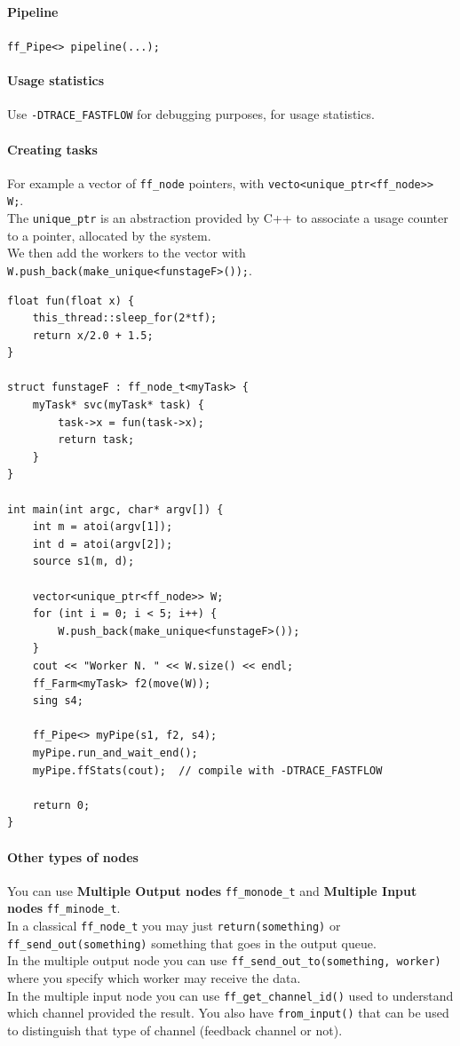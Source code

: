 \documentclass[10pt]{report}
\begin{document}
\paragraph{Pipeline} \texttt{ff\_Pipe<> pipeline(...);}
\paragraph{Usage statistics} Use \texttt{-DTRACE\_FASTFLOW} for debugging purposes, for usage statistics.
\paragraph{Creating tasks} For example a vector of \texttt{ff\_node} pointers, with \texttt{vecto<unique\_ptr<ff\_node>> W;}.\\
The \texttt{unique\_ptr} is an abstraction provided by C++ to associate a usage counter to a pointer, allocated by the system.\\
We then add the workers to the vector with \texttt{W.push\_back(make\_unique<funstageF>());}.
\pagebreak
\begin{lstlisting}[style=myC]
float fun(float x) {
	this_thread::sleep_for(2*tf);
	return x/2.0 + 1.5;
}

struct funstageF : ff_node_t<myTask> {
	myTask* svc(myTask* task) {
		task->x = fun(task->x);
		return task;
	}
}

int main(int argc, char* argv[]) {
	int m = atoi(argv[1]);
	int d = atoi(argv[2]);
	source s1(m, d);
	
	vector<unique_ptr<ff_node>> W;
	for (int i = 0; i < 5; i++) {
		W.push_back(make_unique<funstageF>());
	}
	cout << "Worker N. " << W.size() << endl;
	ff_Farm<myTask> f2(move(W));
	sing s4;
	
	ff_Pipe<> myPipe(s1, f2, s4);
	myPipe.run_and_wait_end();
	myPipe.ffStats(cout);  // compile with -DTRACE_FASTFLOW
	
	return 0;
}
\end{lstlisting}
\paragraph{Other types of nodes} You can use \textbf{Multiple Output nodes} \texttt{ff\_monode\_t} and \textbf{Multiple Input nodes} \texttt{ff\_minode\_t}.\\
In a classical \texttt{ff\_node\_t} you may just \texttt{return(something)} or \texttt{ff\_send\_out(something)} something that goes in the output queue.\\
In the multiple output node you can use \texttt{ff\_send\_out\_to(something, worker)} where you specify which worker may receive the data.\\
In the multiple input node you can use \texttt{ff\_get\_channel\_id()} used to understand which channel provided the result. You also have \texttt{from\_input()} that can be used to distinguish that type of channel (feedback channel or not).
\end{document}
